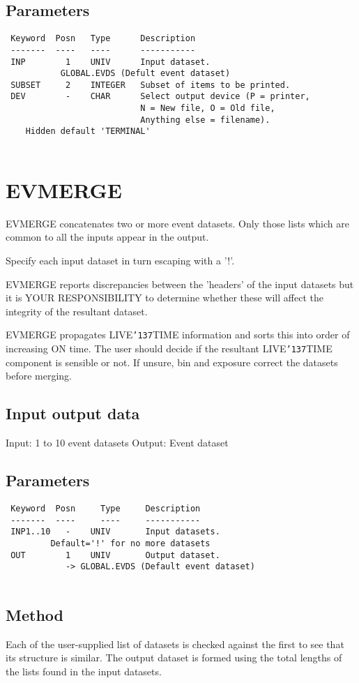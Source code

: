 \documentclass{book}
\renewcommand{\_}{{\tt\char'137}}     %
\begin{document}
\subsection{Parameters}
\begin{verbatim}
 Keyword  Posn   Type      Description
 -------  ----   ----      -----------
 INP        1    UNIV      Input dataset.
           GLOBAL.EVDS (Defult event dataset)
 SUBSET     2    INTEGER   Subset of items to be printed.
 DEV        -    CHAR      Select output device (P = printer,
                           N = New file, O = Old file,
                           Anything else = filename).
    Hidden default 'TERMINAL'
 
\end{verbatim}\section{EVMERGE}
EVMERGE concatenates two or more event datasets. Only those lists
which are common to all the inputs appear in the output.
 
Specify each input dataset in turn escaping with a '!'.
 
EVMERGE reports discrepancies between the 'headers' of the input
datasets but it is YOUR RESPONSIBILITY to determine whether these
will affect the integrity of the resultant dataset.
 
EVMERGE propagates LIVE\_TIME information and sorts this into order
of increasing ON time. The user should decide if the resultant
LIVE\_TIME component is sensible or not. If unsure, bin and
exposure correct the datasets before merging.
\subsection{Input output data}
Input: 1 to 10 event datasets
Output: Event dataset
\subsection{Parameters}
\begin{verbatim}
 Keyword  Posn     Type     Description
 -------  ----     ----     -----------
 INP1..10   -    UNIV       Input datasets.
         Default='!' for no more datasets
 OUT        1    UNIV       Output dataset.
            -> GLOBAL.EVDS (Default event dataset)
 
\end{verbatim}\subsection{Method}
Each of the user-supplied list of datasets is checked against the
first to see that its structure is similar. The output dataset is
formed using the total lengths of the lists found in the input
datasets.
 
\end{document}
